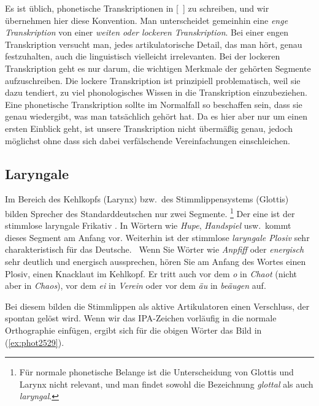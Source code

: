 Es ist üblich, phonetische Transkriptionen in [~] zu schreiben, und wir übernehmen hier diese Konvention.
Man unterscheidet gemeinhin eine \textit{enge Transkription} von einer \textit{weiten oder lockeren Transkription}.
Bei einer engen Transkription versucht man, jedes artikulatorische Detail, das man hört, genau festzuhalten, auch die linguistisch vielleicht irrelevanten.
Bei der lockeren Transkription geht es nur darum, die wichtigen Merkmale der gehörten Segmente aufzuschreiben.
Die lockere Transkription ist prinzipiell problematisch, weil sie dazu tendiert, zu viel phonologisches Wissen in die Transkription einzubeziehen.
Eine phonetische Transkription sollte im Normalfall so beschaffen sein, dass sie genau wiedergibt, was man tatsächlich gehört hat.
Da es hier aber nur um einen ersten Einblick geht, ist unsere Transkription nicht übermäßig genau, jedoch möglichst ohne dass sich dabei verfälschende Vereinfachungen einschleichen.

\subsection{Laryngale}

\label{sec:laryngale}


Im Bereich des Kehlkopfs (Larynx) bzw.\ des Stimmlippensystems (Glottis) bilden Sprecher des Standarddeutschen nur zwei Segmente.%
\footnote{Für normale phonetische Belange ist die Unterscheidung von Glottis und Larynx nicht relevant, und man findet sowohl die Bezeichnung \textit{glottal} als auch \textit{laryngal}.}
Der eine ist der stimmlose laryngale Frikativ \textipa{[h]}.
In Wörtern wie \textit{Hupe}, \textit{Handspiel} usw.\ kommt dieses Segment am Anfang vor.
Weiterhin ist der stimmlose \textit{laryngale Plosiv} \textipa{[P]} sehr charakteristisch für das Deutsche.
\TuBegin~Wenn Sie Wörter wie \textit{Anpfiff} oder \textit{energisch} sehr deutlich und energisch aussprechen, hören Sie am Anfang des Wortes einen Plosiv, einen Knacklaut im Kehlkopf.
Er tritt auch vor dem \textit{o} in \textit{Chaot} (nicht aber in \textit{Chaos}), vor dem \textit{ei} in \textit{Verein} oder vor dem \textit{äu} in \textit{beäugen} auf.

Bei diesem bilden die Stimmlippen als aktive Artikulatoren einen Verschluss, der spontan gelöst wird.
Wenn wir das IPA-Zeichen  vorläufig in die normale Orthographie einfügen, ergibt sich für die obigen Wörter das Bild in (\ref{ex:phot2529}).

